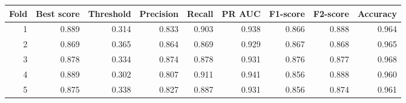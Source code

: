 \begin{tabular}{rrrrrrrrr}
\toprule
Fold & Best score & Threshold & Precision & Recall & PR AUC & F1-score & F2-score & Accuracy \\
\midrule
1 & 0.889 & 0.314 & 0.833 & 0.903 & 0.938 & 0.866 & 0.888 & 0.964 \\
2 & 0.869 & 0.365 & 0.864 & 0.869 & 0.929 & 0.867 & 0.868 & 0.965 \\
3 & 0.878 & 0.334 & 0.874 & 0.878 & 0.931 & 0.876 & 0.877 & 0.968 \\
4 & 0.889 & 0.302 & 0.807 & 0.911 & 0.941 & 0.856 & 0.888 & 0.960 \\
5 & 0.875 & 0.338 & 0.827 & 0.887 & 0.931 & 0.856 & 0.874 & 0.961 \\
\bottomrule
\end{tabular}
